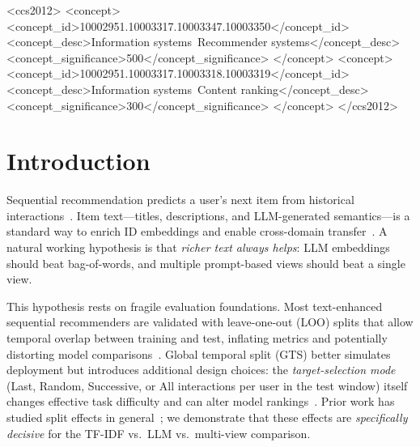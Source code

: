 \documentclass[sigconf,natbib=true,anonymous]{acmart}
\newcommand{\tfidf}{\textsc{TF-IDF}\xspace}
\newcommand{\llm}{\textsc{LLM}\xspace}
\begin{document}
\begin{CCSXML}
<ccs2012>
 <concept>
  <concept_id>10002951.10003317.10003347.10003350</concept_id>
  <concept_desc>Information systems~Recommender systems</concept_desc>
  <concept_significance>500</concept_significance>
 </concept>
 <concept>
  <concept_id>10002951.10003317.10003318.10003319</concept_id>
  <concept_desc>Information systems~Content ranking</concept_desc>
  <concept_significance>300</concept_significance>
 </concept>
</ccs2012>
\end{CCSXML}


\maketitle

\section{Introduction}
\label{sec:intro}

Sequential recommendation predicts a user's next item from historical interactions~\cite{kang2018sasrec,sun2019bert4rec,hidasi2016gru4rec}.
Item text---titles, descriptions, and LLM-generated semantics---is a standard way to enrich ID embeddings and enable cross-domain transfer~\cite{hou2022unisrec,bao2023tallrec}.
A natural working hypothesis is that \emph{richer text always helps}: LLM embeddings should beat bag-of-words, and multiple prompt-based views should beat a single view.

This hypothesis rests on fragile evaluation foundations.
Most text-enhanced sequential recommenders are validated with leave-one-out (LOO) splits that allow temporal overlap between training and test, inflating metrics and potentially distorting model comparisons~\cite{ji2023evaluation,sun2023reevaluation}.
Global temporal split (GTS) better simulates deployment but introduces additional design choices: the \emph{target-selection mode} (Last, Random, Successive, or All interactions per user in the test window) itself changes effective task difficulty and can alter model rankings~\cite{liang2024timetosplit}.
Prior work has studied split effects in general~\cite{meng2020temporal,ji2023evaluation}; we demonstrate that these effects are \emph{specifically decisive} for the \tfidf vs.\ \llm vs.\ multi-view comparison.
\end{document}
